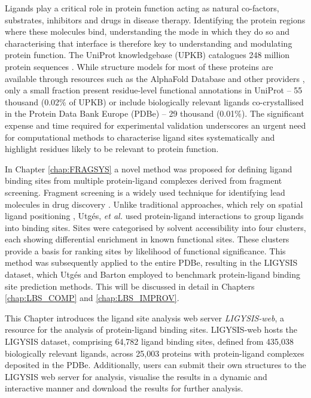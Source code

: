 Ligands play a critical role in protein function acting as natural co-factors, substrates, inhibitors and drugs in disease therapy. Identifying the protein regions where these molecules bind, understanding the mode in which they do so and characterising that interface is therefore key to understanding and modulating protein function. The UniProt knowledgebase (UPKB) catalogues 248 million protein sequences \cite{UNIPROT_2018_UNIPROT, UNIPROT_2023_UNIPROT}. While structure models for most of these proteins are available through resources such as the AlphaFold Database \cite{JUMPER_2021_ALPHAFOLD, VARADI_2022_ALPHAFOLDDB, ABRAMSON_2024_ALPHAFOLD3} and other providers \cite{GUEX_2009_SWISSMODEL, BEIENERT_2016_SWISSMODEL, WATERHOUSE_2018_SWISSMODEL}, only a small fraction present residue-level functional annotations in UniProt – 55 thousand (0.02\% of UPKB) or include biologically relevant ligands co-crystallised in the Protein Data Bank Europe (PDBe) \cite{BERMAN_2003_PDB, wwPDB_2019_PDB} – 29 thousand (0.01\%). The significant expense and time required for experimental validation underscores an urgent need for computational methods to characterise ligand sites  systematically and highlight residues likely to be relevant to protein function.

In Chapter \ref{chap:FRAGSYS} a novel method was proposed for defining ligand binding sites from multiple protein-ligand complexes derived from fragment screening. Fragment screening is a widely used technique for identifying lead molecules in drug discovery \cite{CONGREVE_2003_RO3, REES_2004_FBLD, MURRAY_2009_FBDD}. Unlike traditional approaches, which rely on spatial ligand positioning \cite{SHIN_2005_PDBLIGAND, KOZAKOV_2005_CLUSTERING, WASS_2010_3DLIGANDSITE, MCGREIG_2022_3DLIGANDSITE}, Utgés, \textit{et al.} \cite{UTGES_2024_FRAGSYS} used protein-ligand interactions to group ligands into binding sites. Sites were categorised by solvent accessibility into four clusters, each showing differential enrichment in known functional sites. These clusters provide a basis for ranking sites by likelihood of functional significance. This method was subsequently applied to the entire PDBe, resulting in the LIGYSIS dataset, which Utgés and Barton \cite{UTGES_2024_LBSCOMP} employed to benchmark protein-ligand binding site prediction methods. This will be discussed in detail in Chapters \ref{chap:LBS_COMP} and \ref{chap:LBS_IMPROV}.

This Chapter introduces the ligand site analysis web server \textit{LIGYSIS-web}, a resource for the analysis of protein-ligand binding sites. LIGYSIS-web hosts the LIGYSIS dataset, comprising 64,782 ligand binding sites, defined from 435,038 biologically relevant ligands, across 25,003 proteins with protein-ligand complexes deposited in the PDBe. Additionally, users can submit their own structures to the LIGYSIS web server for analysis, visualise the results in a dynamic and interactive manner and download the results for further analysis.



